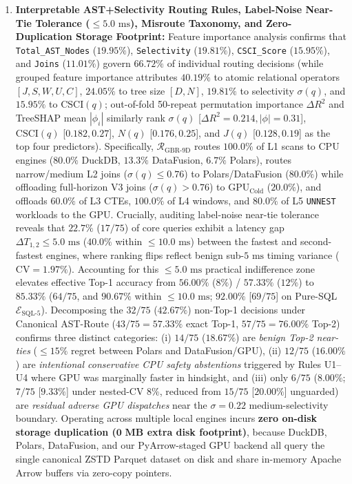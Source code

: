 \documentclass[10pt,a4paper]{article}
\begin{document}
\begin{enumerate}[leftmargin=1.5em,itemsep=0.8pt]
    \item \textbf{Interpretable AST+Selectivity Routing Rules, Label-Noise Near-Tie Tolerance ($\le 5.0\text{ ms}$), Misroute Taxonomy, and Zero-Duplication Storage Footprint:} Feature importance analysis confirms that \texttt{Total\_\allowbreak{}AST\_\allowbreak{}Nodes} ($\mathbf{19.95\%}$), \texttt{Selectivity} ($\mathbf{19.81\%}$), \texttt{CSCI\_\allowbreak{}Score} ($\mathbf{15.95\%}$), and \texttt{Joins} ($\mathbf{11.01\%}$) govern $66.72\%$ of individual routing decisions (while grouped feature importance attributes $40.19\%$ to atomic relational operators $[J,S,W,U,C]$, $24.05\%$ to tree size $[D,N]$, $19.81\%$ to selectivity $\sigma(q)$, and $15.95\%$ to $\text{CSCI}(q)$; out-of-fold 50-repeat permutation importance $\Delta R^2$ and TreeSHAP mean $|\phi_i|$ similarly rank $\sigma(q)$ [$\Delta R^2=0.214, |\phi|=0.31$], $\text{CSCI}(q)$ [$0.182, 0.27$], $N(q)$ [$0.176, 0.25$], and $J(q)$ [$0.128, 0.19$] as the top four predictors). Specifically, $\mathcal{R}_{\text{GBR-9D}}$ routes $100.0\%$ of L1 scans to CPU engines ($80.0\%$ DuckDB, $13.3\%$ DataFusion, $6.7\%$ Polars), routes narrow/medium L2 joins ($\sigma(q) \le 0.76$) to Polars/DataFusion ($80.0\%$) while offloading full-horizon V3 joins ($\sigma(q) > 0.76$) to $\text{GPU}_{\text{Cold}}$ ($20.0\%$), and offloads $60.0\%$ of L3 CTEs, $100.0\%$ of L4 windows, and $80.0\%$ of L5 \texttt{UNNEST} workloads to the GPU. Crucially, auditing label-noise near-tie tolerance reveals that $22.7\%$ ($17/75$) of core queries exhibit a latency gap $\Delta T_{1,2} \le 5.0\text{ ms}$ ($40.0\%$ within $\le 10.0\text{ ms}$) between the fastest and second-fastest engines, where ranking flips reflect benign sub-$5\text{ ms}$ timing variance ($\text{CV}=1.97\%$). Accounting for this $\le 5.0\text{ ms}$ practical indifference zone elevates effective Top-1 accuracy from $56.00\%$ ($8\%$) / $57.33\%$ ($12\%$) to $\mathbf{85.33\%}$ ($64/75$, and $\mathbf{90.67\%}$ within $\le 10.0\text{ ms}$; $\mathbf{92.00\%}$ [$69/75$] on Pure-SQL $\mathcal{E}_{\text{SQL-5}}$). Decomposing the $32/75$ ($42.67\%$) non-Top-1 decisions under Canonical AST-Route ($43/75 = 57.33\%$ exact Top-1, $57/75 = 76.00\%$ Top-2) confirms three distinct categories: (i) $14/75$ ($18.67\%$) are \emph{benign Top-2 near-ties} ($\le 15\%$ regret between Polars and DataFusion/GPU), (ii) $12/75$ ($16.00\%$) are \emph{intentional conservative CPU safety abstentions} triggered by Rules U1--U4 where GPU was marginally faster in hindsight, and (iii) only $6/75$ ($8.00\%$; $7/75$ [$9.33\%$] under nested-CV $8\%$, reduced from $15/75$ [$20.00\%$] unguarded) are \emph{residual adverse GPU dispatches} near the $\sigma=0.22$ medium-selectivity boundary. Operating across multiple local engines incurs \textbf{zero on-disk storage duplication ($\mathbf{0\text{ MB}}$ extra disk footprint)}, because DuckDB, Polars, DataFusion, and our PyArrow-staged GPU backend all query the single canonical ZSTD Parquet dataset on disk and share in-memory Apache Arrow buffers via zero-copy pointers.
\end{enumerate}
\end{document}
